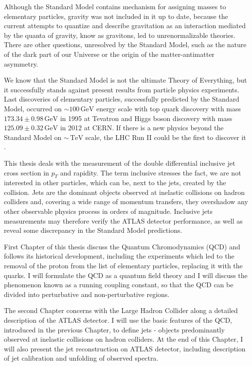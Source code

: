 \documentclass[a4paper,11pt,twoside,openright]{book}
\newcommand{\TeV}{\,\text{TeV}}
\newcommand{\GeV}{\,\text{GeV}}
\newcommand{\pt}{p_{T}}
\begin{document}
Although the Standard Model contains mechanism for assigning masses to
elementary particles, gravity was not included in it up
to date, because the current attempts to quantize and describe gravitation as an
interaction mediated by the quanta of gravity, know as gravitons, led to
unrenormalizable theories. There are other questions, unresolved by the Standard
Model, such as the nature of the dark part of our Universe or the origin of the
matter-antimatter asymmetry.

We know that the Standard Model is not the ultimate Theory of Everything,
but it successfully stands against present results from particle physics
experiments. 
Last discoveries of elementary particles, successfully predicted by the Standard
Model, occurred on $\sim 100\GeV$ energy scale with top quark discovery
\cite{TopQuark1,TopQuark2} with mass $173.34 \pm 0.98 \GeV$ in 1995 at Tevatron
and Higgs boson discovery \cite{HiggsDiscovery} with mass $125.09 \pm 0.32 \GeV$
in 2012 at CERN.
If there is a new physics beyond the Standard Model on $\sim \TeV$ scale, the
LHC Run II could be the first to discover it \cite{PhysicsAtRun2LHC}. 

This thesis deals with the measurement of the double differential inclusive jet 
cross section in $\pt$ and rapidity. 
The term inclusive stresses the fact, we are not interested in other particles,
which can be, next to the jets, created by the collision.
Jets are the dominant objects observed at inelastic collisions on hadron
colliders and, covering a wide range of momentum transfers, they overshadow any
other observable physics process in orders of magnitude.
Inclusive jets measurements may therefore verify the ATLAS detector performance,
as well as reveal some discrepancy in the Standard Model predictions.

First Chapter of this thesis discuss the Quantum Chromodynamics (QCD) and
follows its historical development, including the experiments which led to the
removal of the proton from the list of elementary particles, replacing it with
the quarks. 
I will formulate the QCD as a quantum field theory and I will discuss the phenomenon
known as a running coupling constant, so that the QCD can be divided into
perturbative and non-perturbative regions.

The second Chapter concerns with the Large Hadron Collider along a detailed
description of the ATLAS detector. 
I will use the basic features of the QCD, introduced in the previous Chapter, to
define jets - objects predominantly observed at inelastic collisions on hadron
colliders. At the end of this Chapter, I will also present the jet
reconstruction on ATLAS detector, including description of jet calibration and
unfolding of observed spectra.
\end{document}
